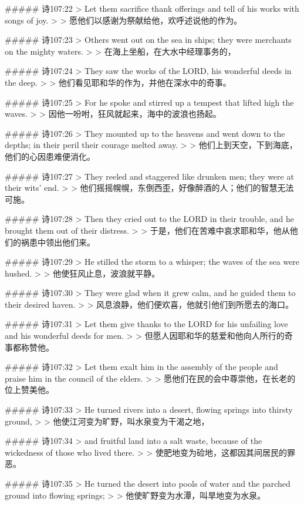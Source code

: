 ##### 诗107:22
> Let them sacrifice thank offerings and tell of his works with songs of joy.
>
> 愿他们以感谢为祭献给他，欢呼述说他的作为。


##### 诗107:23
> Others went out on the sea in ships; they were merchants on the mighty waters.
>
> 在海上坐船，在大水中经理事务的，


##### 诗107:24
> They saw the works of the LORD, his wonderful deeds in the deep.
>
> 他们看见耶和华的作为，并他在深水中的奇事。


##### 诗107:25
> For he spoke and stirred up a tempest that lifted high the waves.
>
> 因他一吩咐，狂风就起来，海中的波浪也扬起。


##### 诗107:26
> They mounted up to the heavens and went down to the depths; in their peril their courage melted away.
>
> 他们上到天空，下到海底，他们的心因患难便消化。


##### 诗107:27
> They reeled and staggered like drunken men; they were at their wits' end.
>
> 他们摇摇幌幌，东倒西歪，好像醉酒的人；他们的智慧无法可施。


##### 诗107:28
> Then they cried out to the LORD in their trouble, and he brought them out of their distress.
>
> 于是，他们在苦难中哀求耶和华，他从他们的祸患中领出他们来。


##### 诗107:29
> He stilled the storm to a whisper; the waves of the sea were hushed.
>
> 他使狂风止息，波浪就平静。


##### 诗107:30
> They were glad when it grew calm, and he guided them to their desired haven.
>
> 风息浪静，他们便欢喜，他就引他们到所愿去的海口。


##### 诗107:31
> Let them give thanks to the LORD for his unfailing love and his wonderful deeds for men.
>
> 但愿人因耶和华的慈爱和他向人所行的奇事都称赞他。


##### 诗107:32
> Let them exalt him in the assembly of the people and praise him in the council of the elders.
>
> 愿他们在民的会中尊崇他，在长老的位上赞美他。


##### 诗107:33
> He turned rivers into a desert, flowing springs into thirsty ground,
>
> 他使江河变为旷野，叫水泉变为干渴之地，


##### 诗107:34
> and fruitful land into a salt waste, because of the wickedness of those who lived there.
>
> 使肥地变为硷地，这都因其间居民的罪恶。


##### 诗107:35
> He turned the desert into pools of water and the parched ground into flowing springs;
>
> 他使旷野变为水潭，叫旱地变为水泉。


